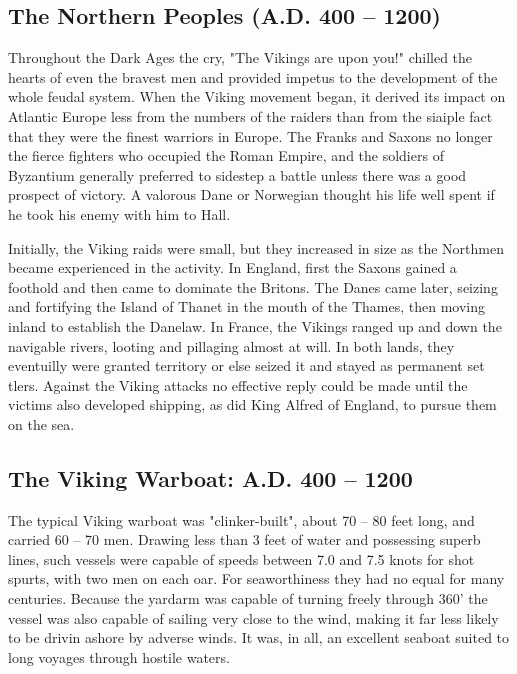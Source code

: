 \documentclass{article}
\begin{document}
\begin{multicols}{3}
\subsection{The Northern Peoples (A.D. 400 -- 1200)}

Throughout the Dark Ages the cry, "The Vikings are upon you!"  chilled
the hearts of even the bravest men and provided impetus to the
development of the whole feudal system.  When the Viking movement
began, it derived its impact on Atlantic Europe less from the numbers
of the raiders than from the siaiple fact that they were the finest
warriors in Europe.  The Franks and Saxons no longer the fierce
fighters who occupied the Roman Empire, and the soldiers of Byzantium
generally preferred to sidestep a battle unless there was a good
prospect of victory.  A valorous Dane or Norwegian thought his life
well spent if he took his enemy with him to Hall.

Initially, the Viking raids were small, but they increased in size as
the Northmen became experienced in the activity.  In England, first
the Saxons gained a foothold and then came to dominate the
Britons. The Danes came later, seizing and fortifying the Island of
Thanet in the mouth of the Thames, then moving inland to establish the
Danelaw.  In France, the Vikings ranged up and down the navigable
rivers, looting and pillaging almost at will.  In both lands, they
eventuilly were granted territory or else seized it and stayed as
permanent set tlers.   Against the Viking attacks no effective reply
could be made until the victims also developed shipping, as did King
Alfred of England, to pursue them on the sea.

\subsection{The Viking Warboat:  A.D. 400 -- 1200}

The typical Viking warboat was "clinker-built", about 70 -- 80 feet
long, and carried 60 -- 70 men.  Drawing less than 3 feet of water and
possessing superb lines, such vessels were capable of speeds between
7.0 and 7.5 knots for shot spurts, with two men on each oar.  For
seaworthiness they had no equal for many centuries.  Because the
yardarm was capable of turning freely through 360' the vessel was also
capable of sailing very close to the wind, making it far less likely
to be drivin ashore by adverse winds. It was, in all, an excellent
seaboat suited to long voyages through hostile waters.


\end{multicols}
\end{document}
